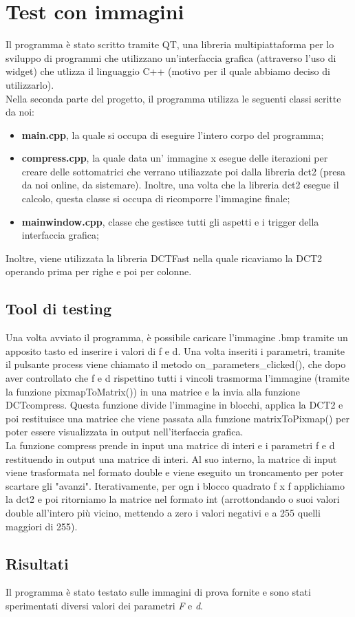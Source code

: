 \documentclass[a4paper,12pt]{report}
\newcommand{\mychapter}[2]{
    \setcounter{chapter}{#1}
    \setcounter{section}{0}
    \chapter*{#2}
    \addcontentsline{toc}{chapter}{#2}
}
\begin{document}
\mychapter{2}{Test con immagini}
Il programma è stato scritto tramite QT, una libreria multipiattaforma per lo sviluppo di programmi che utilizzano un'interfaccia grafica (attraverso l'uso di widget) che utlizza il linguaggio C++ (motivo per il quale abbiamo deciso di utilizzarlo).\\
Nella seconda parte del progetto, il programma utilizza le seguenti classi scritte da noi:
\begin{itemize}
\item \textbf{main.cpp}, la quale si occupa di eseguire l'intero corpo del programma;
\item \textbf{compress.cpp}, la quale data un' immagine x esegue delle iterazioni per creare delle sottomatrici che verrano utiliazzate poi dalla libreria dct2 (presa da noi online, da sistemare). Inoltre, una volta che la libreria dct2 esegue il calcolo, questa classe si occupa di ricomporre l'immagine finale;
\item \textbf{mainwindow.cpp}, classe che gestisce tutti gli aspetti e i trigger della interfaccia grafica;
\end{itemize}
Inoltre, viene utilizzata la libreria DCTFast nella quale ricaviamo la DCT2 operando prima per righe e poi per colonne.\\
 
\section{Tool di testing}
Una volta avviato il programma, è possibile caricare l'immagine .bmp tramite un apposito tasto ed inserire i valori di f e d. Una volta inseriti i parametri, tramite il pulsante process viene chiamato il metodo on\_parameters\_clicked(), che dopo aver controllato che f e d rispettino tutti i vincoli trasmorma l'immagine (tramite la funzione pixmapToMatrix()) in una matrice e la invia alla funzione DCTcompress. Questa funzione divide l'immagine in blocchi, applica la DCT2 e poi restituisce una matrice che viene passata alla funzione matrixToPixmap() per poter essere visualizzata in output nell'iterfaccia grafica.\\
La funzione compress prende in input una matrice di interi e i parametri f e d restituendo in output una matrice di interi. Al suo interno, la matrice di input viene trasformata nel formato double e viene eseguito un troncamento per poter scartare gli "avanzi". Iterativamente, per ogn i blocco quadrato f x f applichiamo la dct2 e poi ritorniamo la matrice nel formato int (arrottondando o suoi valori double all'intero più vicino, mettendo a zero i valori negativi e a 255 quelli maggiori di 255). 

\section{Risultati}
Il programma è stato testato sulle immagini di prova fornite e sono stati sperimentati diversi valori dei parametri \textit{F} e \textit{d}.

\printbibliography
\end{document}
